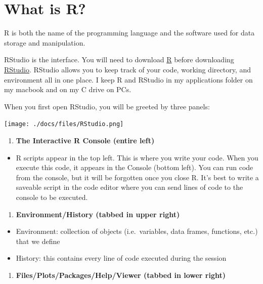 \documentclass[
]{book}
\providecommand{\tightlist}{%
  \setlength{\itemsep}{0pt}\setlength{\parskip}{0pt}}
\begin{document}
\section{What is R?}\label{what-is-r}

R is both the name of the programming language and the software used for data storage and manipulation.

RStudio is the interface. You will need to download \href{https://cran.r-project.org}{R} before downloading
\href{https://posit.co/downloads/}{RStudio}. RStudio allows you to keep track of your code, working directory, and environment all in one place. I keep R and RStudio in my applications folder on my macbook and on my C drive on PCs.

When you first open RStudio, you will be greeted by three panels:

\texttt{[image: ./docs/files/RStudio.png]}

\begin{enumerate}
\def\labelenumi{\arabic{enumi})}
\tightlist
\item
  \textbf{The Interactive R Console (entire left)}
\end{enumerate}

\begin{itemize}
\tightlist
\item
  R scripts appear in the top left. This is where you write your code. When you execute this code, it appears in the Console (bottom left). You can run code from the console, but it will be forgotten once you close R. It's best to write a saveable script in the code editor where you can send lines of code to the console to be executed.
\end{itemize}

\begin{enumerate}
\def\labelenumi{\arabic{enumi})}
\setcounter{enumi}{1}
\tightlist
\item
  \textbf{Environment/History (tabbed in upper right)}
\end{enumerate}

\begin{itemize}
\tightlist
\item
  Environment: collection of objects (i.e.~variables, data frames, functions, etc.) that we define
\item
  History: this contains every line of code executed during the session
\end{itemize}

\begin{enumerate}
\def\labelenumi{\arabic{enumi})}
\setcounter{enumi}{2}
\tightlist
\item
  \textbf{Files/Plots/Packages/Help/Viewer (tabbed in lower right)}
\end{enumerate}
\end{document}
